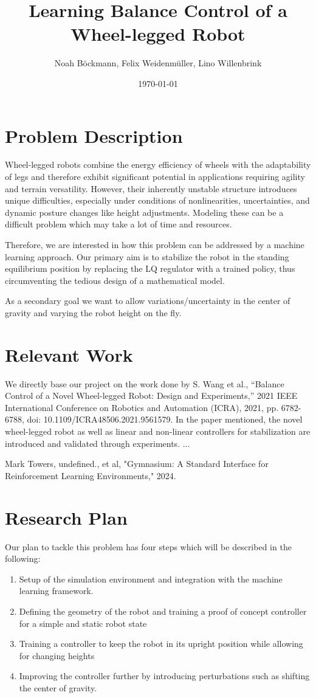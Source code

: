 \documentclass[a4paper]{article}
\title{Learning Balance Control of a Wheel-legged Robot}
\author{Noah Böckmann, Felix Weidenmüller, Lino Willenbrink}
\date{\today}
\begin{document}
\maketitle
\section{Problem Description}
Wheel-legged robots combine the energy efficiency of wheels with the adaptability of legs and
therefore exhibit significant potential in applications requiring agility and terrain versatility.
However, their inherently unstable structure introduces unique difficulties, especially under
conditions of nonlinearities, uncertainties, and dynamic posture changes like height adjustments.
Modeling these can be a difficult problem which may take a lot of time and resources.

Therefore, we are interested in how this problem can be addressed by a machine learning approach.
Our primary aim is to stabilize the robot in the standing equilibrium position by replacing the LQ
regulator with a trained policy, thus circumventing the tedious design of a mathematical model.

As a secondary goal we want to allow variations/uncertainty in the center of gravity and varying the
robot height on the fly.

\section{Relevant Work}
We directly base our project on the work done by S. Wang et al., ``Balance Control of a Novel Wheel-legged Robot: Design and Experiments,'' 2021 IEEE International Conference on Robotics and Automation (ICRA), 2021, pp. 6782-6788, doi: 10.1109/ICRA48506.2021.9561579. In the paper mentioned, the novel wheel-legged robot as well as linear and non-linear controllers for stabilization are introduced and validated through experiments.
... \newline

Mark Towers, undefined., et al, "Gymnasium: A Standard Interface for Reinforcement Learning Environments," 2024.

\section{Research Plan}
Our plan to tackle this problem has four steps which will be described in the following:
\begin{enumerate}
  \item Setup of the simulation environment and integration with the machine learning framework.
  \item Defining the geometry of the robot and training a proof of concept controller for a simple
        and static robot state
  \item Training a controller to keep the robot in its upright position while allowing for changing heights
  \item Improving the controller further by introducing perturbations such as shifting the center of
        gravity.
\end{enumerate}
\end{document}
